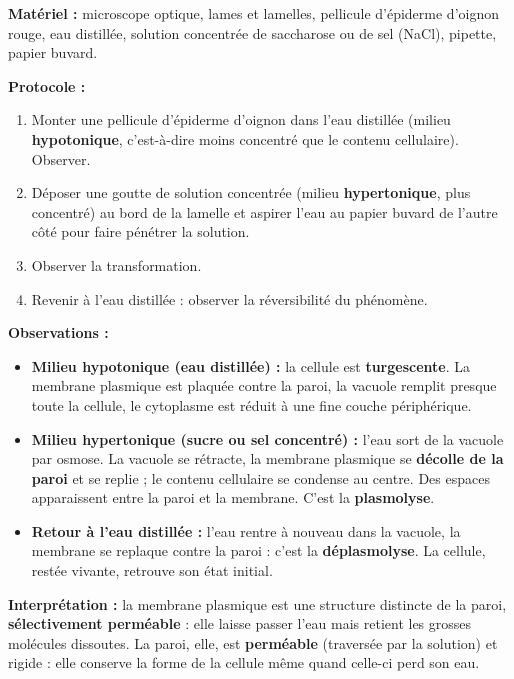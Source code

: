 \documentclass[11pt]{article}
\begin{document}
\begin{experience}
\textbf{Matériel :} microscope optique, lames et lamelles, pellicule d'épiderme d'oignon rouge, eau distillée, solution concentrée de saccharose ou de sel (NaCl), pipette, papier buvard.

\textbf{Protocole :}
\begin{enumerate}
    \item Monter une pellicule d'épiderme d'oignon dans l'eau distillée (milieu \textbf{hypotonique}, c'est-à-dire moins concentré que le contenu cellulaire). Observer.
    \item Déposer une goutte de solution concentrée (milieu \textbf{hypertonique}, plus concentré) au bord de la lamelle et aspirer l'eau au papier buvard de l'autre côté pour faire pénétrer la solution.
    \item Observer la transformation.
    \item Revenir à l'eau distillée : observer la réversibilité du phénomène.
\end{enumerate}

\textbf{Observations :}
\begin{itemize}
    \item \textbf{Milieu hypotonique (eau distillée) :} la cellule est \textbf{turgescente}. La membrane plasmique est plaquée contre la paroi, la vacuole remplit presque toute la cellule, le cytoplasme est réduit à une fine couche périphérique.
    \item \textbf{Milieu hypertonique (sucre ou sel concentré) :} l'eau sort de la vacuole par osmose. La vacuole se rétracte, la membrane plasmique se \textbf{décolle de la paroi} et se replie ; le contenu cellulaire se condense au centre. Des espaces apparaissent entre la paroi et la membrane. C'est la \textbf{plasmolyse}.
    \item \textbf{Retour à l'eau distillée :} l'eau rentre à nouveau dans la vacuole, la membrane se replaque contre la paroi : c'est la \textbf{déplasmolyse}. La cellule, restée vivante, retrouve son état initial.
\end{itemize}

\textbf{Interprétation :} la membrane plasmique est une structure distincte de la paroi, \textbf{sélectivement perméable} : elle laisse passer l'eau mais retient les grosses molécules dissoutes. La paroi, elle, est \textbf{perméable} (traversée par la solution) et rigide : elle conserve la forme de la cellule même quand celle-ci perd son eau.
\end{experience}
\end{document}

